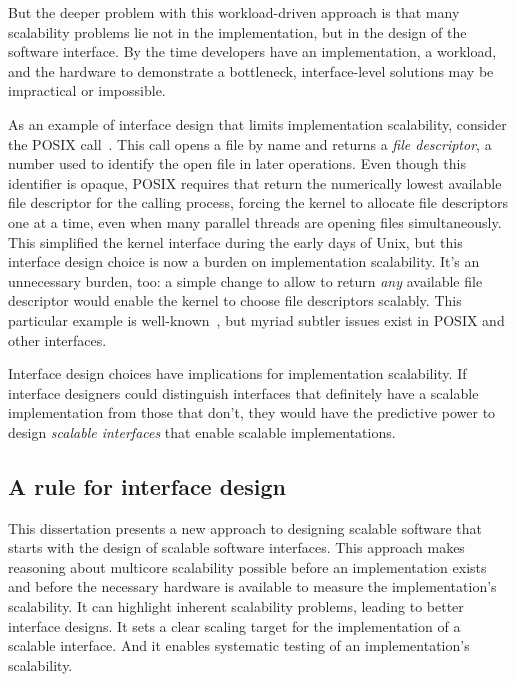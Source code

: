 But the deeper problem with this workload-driven approach is that many
scalability problems lie not in the implementation, but in the design
of the
software interface.  By the time developers have an implementation, a
workload, and the hardware to demonstrate a bottleneck,
interface-level solutions may be impractical or impossible.

As an example of interface design that limits implementation
scalability, consider the POSIX  call~\cite{posix2013}.
%
This call opens a
file by name and returns a \emph{file descriptor}, a number used to
identify the open file in later operations.
%
Even though this identifier is opaque, POSIX requires that 
return the numerically lowest available file descriptor for the
calling process, forcing the kernel to allocate file descriptors one
at a time, even when many parallel threads are opening files
simultaneously.
%
This simplified the kernel interface during the early days of Unix,
but this interface design choice is now a burden on implementation
scalability.
%
It's an unnecessary burden, too: a simple change to allow 
to return \emph{any} available file descriptor would enable the kernel
to choose file descriptors scalably.
%
This particular example is well-known~\cite{boyd-wickizer:corey}, but
myriad subtler issues exist in POSIX and other interfaces.

Interface design choices have implications for implementation
scalability.
%
If interface designers could distinguish interfaces that definitely
have a scalable implementation from those that don't, they would have
the predictive power to design \emph{scalable interfaces} that enable
scalable implementations.


\subsection{A rule for interface design}

This dissertation presents a new approach to designing scalable software
that starts with the design of scalable software interfaces.
%
This approach makes reasoning about multicore scalability possible
before an implementation exists and before the necessary hardware is
available to measure the implementation's scalability.
%
It can highlight inherent scalability problems, leading to better
interface designs.
%
It sets a clear scaling target for the implementation of a
scalable interface.  And it enables systematic testing of an
implementation's scalability.

